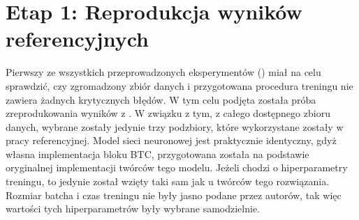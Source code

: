 \section{Etap 1: Reprodukcja wyników referencyjnych}

Pierwszy ze wszystkich przeprowadzonych eksperymentów () miał na celu sprawdzić, czy zgromadzony zbiór danych i przygotowana procedura treningu nie zawiera żadnych krytycznych błędów. W tym celu podjęta została próba zreprodukowania wyników z \cite{park_bi-directional_2019}. W związku z tym, z całego dostępnego zbioru danych, wybrane zostały jedynie trzy podzbiory, które wykorzystane zostały w pracy referencyjnej. Model sieci neuronowej jest praktycznie identyczny, gdyż własna implementacja bloku BTC, przygotowana została na podstawie oryginalnej implementacji twórców tego modelu. Jeżeli chodzi o hiperparametry treningu, to jedynie  został wzięty taki sam jak u twórców tego rozwiązania. Rozmiar batcha i czas treningu nie były jasno podane przez autorów, tak więc wartości tych hiperparametrów były wybrane samodzielnie.

